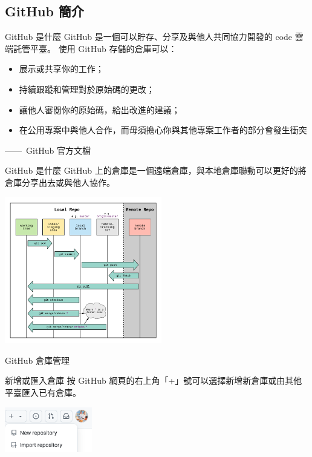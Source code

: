 \documentclass[xetex, unicode, 10pt, aspectratio=169]{beamer}
\begin{document}
\subsection{GitHub 簡介}

\begin{frame}{GitHub 是什麼}
    GitHub 是一個可以貯存、分享及與他人共同協力開發的 code 雲端託管平臺。
    使用 GitHub 存儲的倉庫可以：
    \begin{itemize}
        \item 展示或共享你的工作；
        \item 持續跟蹤和管理對於原始碼的更改；
        \item 讓他人審閱你的原始碼，給出改進的建議；
        \item 在公用專案中與他人合作，而毋須擔心你與其他專案工作者的部分會發生衝突
    \end{itemize}

    \hfill ——\ GitHub 官方文檔
\end{frame}

\begin{frame}{GitHub 是什麼}
    GitHub 上的倉庫是一個遠端倉庫，與本地倉庫聯動可以更好的將倉庫分享出去或與他人協作。
    \begin{center}
        \includegraphics[width=2.7in]{./img/git-workflow.png}
    \end{center}
\end{frame}

\begin{frame}{GitHub 倉庫管理}
    \begin{block}{新增或匯入倉庫}
        按 GitHub 網頁的右上角「+」號可以選擇新增新倉庫或由其他平臺匯入已有倉庫。
        \begin{center}
            \includegraphics[width=1.5in]{./img/github-add-import-repo.png}
        \end{center}
    \end{block}
\end{frame}
\end{document}
